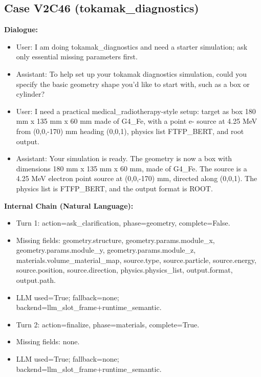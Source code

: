 \documentclass[11pt]{ctexart}
\begin{document}
\subsection{Case V2C46 (tokamak\_diagnostics)}
\textbf{Dialogue:}
\begin{itemize}
\item User: I am doing tokamak\_diagnostics and need a starter simulation; ask only essential missing parameters first.
\item Assistant: To help set up your tokamak diagnostics simulation, could you specify the basic geometry shape you'd like to start with, such as a box or cylinder?
\item User: I need a practical medical\_radiotherapy-style setup: target as box 180 mm x 135 mm x 60 mm made of G4\_Fe, with a point e- source at 4.25 MeV from (0,0,-170) mm heading (0,0,1), physics list FTFP\_BERT, and root output.
\item Assistant: Your simulation is ready. The geometry is now a box with dimensions 180 mm x 135 mm x 60 mm, made of G4\_Fe. The source is a 4.25 MeV electron point source at (0,0,-170) mm, directed along (0,0,1). The physics list is FTFP\_BERT, and the output format is ROOT.
\end{itemize}
\textbf{Internal Chain (Natural Language):}
\begin{itemize}
\item Turn 1: action=ask\_clarification, phase=geometry, complete=False.
\item Missing fields: geometry.structure, geometry.params.module\_x, geometry.params.module\_y, geometry.params.module\_z, materials.volume\_material\_map, source.type, source.particle, source.energy, source.position, source.direction, physics.physics\_list, output.format, output.path.
\item LLM used=True; fallback=none; backend=llm\_slot\_frame+runtime\_semantic.
\item Turn 2: action=finalize, phase=materials, complete=True.
\item Missing fields: none.
\item LLM used=True; fallback=none; backend=llm\_slot\_frame+runtime\_semantic.
\end{itemize}
\end{document}
